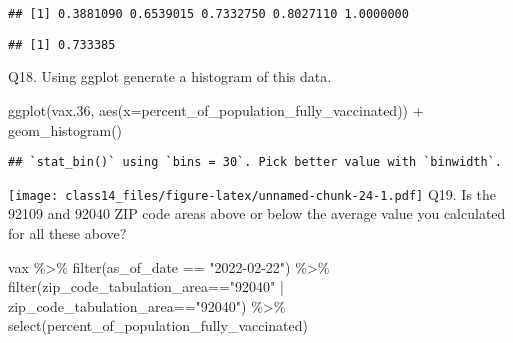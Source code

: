 \documentclass[
]{article}
\newenvironment{Shaded}{\begin{snugshade}}{\end{snugshade}}
\newcommand{\AttributeTok}[1]{\textcolor[rgb]{0.77,0.63,0.00}{#1}}
\newcommand{\FloatTok}[1]{\textcolor[rgb]{0.00,0.00,0.81}{#1}}
\newcommand{\FunctionTok}[1]{\textcolor[rgb]{0.00,0.00,0.00}{#1}}
\newcommand{\NormalTok}[1]{#1}
\newcommand{\SpecialCharTok}[1]{\textcolor[rgb]{0.00,0.00,0.00}{#1}}
\newcommand{\StringTok}[1]{\textcolor[rgb]{0.31,0.60,0.02}{#1}}
\begin{document}
\begin{verbatim}
## [1] 0.3881090 0.6539015 0.7332750 0.8027110 1.0000000
\end{verbatim}

\begin{Shaded}
\end{Shaded}

\begin{verbatim}
## [1] 0.733385
\end{verbatim}

Q18. Using ggplot generate a histogram of this data.

\begin{Shaded}
\begin{Highlighting}[]
\FunctionTok{ggplot}\NormalTok{(vax}\FloatTok{.36}\NormalTok{, }\FunctionTok{aes}\NormalTok{(}\AttributeTok{x=}\NormalTok{percent\_of\_population\_fully\_vaccinated)) }\SpecialCharTok{+} \FunctionTok{geom\_histogram}\NormalTok{()}
\end{Highlighting}
\end{Shaded}

\begin{verbatim}
## `stat_bin()` using `bins = 30`. Pick better value with `binwidth`.
\end{verbatim}

\texttt{[image: class14\_files/figure-latex/unnamed-chunk-24-1.pdf]} Q19.
Is the 92109 and 92040 ZIP code areas above or below the average value
you calculated for all these above?

\begin{Shaded}
\begin{Highlighting}[]
\NormalTok{vax }\SpecialCharTok{\%\textgreater{}\%} \FunctionTok{filter}\NormalTok{(as\_of\_date }\SpecialCharTok{==} \StringTok{"2022{-}02{-}22"}\NormalTok{) }\SpecialCharTok{\%\textgreater{}\%}  
  \FunctionTok{filter}\NormalTok{(zip\_code\_tabulation\_area}\SpecialCharTok{==}\StringTok{"92040"} \SpecialCharTok{|}\NormalTok{ zip\_code\_tabulation\_area}\SpecialCharTok{==}\StringTok{"92040"}\NormalTok{) }\SpecialCharTok{\%\textgreater{}\%}
  \FunctionTok{select}\NormalTok{(percent\_of\_population\_fully\_vaccinated)}
\end{Highlighting}
\end{Shaded}
\end{document}
